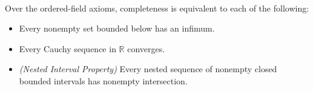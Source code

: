 








\begin{remark*}[Interpretation]~\\
Over the ordered-field axioms, completeness is equivalent to each of the
following:
\begin{itemize}
  \item Every nonempty set bounded below has an infimum.
  \item Every Cauchy sequence in $\mathbb{R}$ converges.
  \item \emph{(Nested Interval Property)} Every nested sequence of nonempty
        closed bounded intervals has nonempty intersection.
\end{itemize}
\end{remark*}